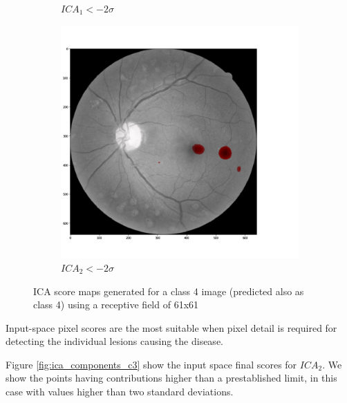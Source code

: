\documentclass[preprint]{elsarticle}
\theoremstyle{definition} %
\theoremstyle{remark}
\begin{document}
\begin{figure}[h!]
\begin{subfigure}[b]{0.32\textwidth}
		\caption{$ICA_1 < - 2 \sigma$}	
	\end{subfigure}
	\begin{subfigure}[b]{0.32\textwidth}
		\centering
		\includegraphics[width=\textwidth]{figures/img_t4_p4/rf61/ica2.png}
		\caption{$ICA_2 < - 2 \sigma$}	
	\end{subfigure}
	\hfill 
	\caption{ICA score maps generated for a class 4 image (predicted also as class 4) using a receptive field of 61x61}  
	\label{fig:ica_components_class4} 
\end{figure}

Input-space pixel scores are the most suitable when pixel detail is required for detecting the individual lesions causing the disease.

Figure \ref{fig:ica_components_c3} show the input space final scores for $ICA_2$. We show the points having contributions higher than a prestablished limit, in this case with values higher than two standard deviations. 
\end{document}
